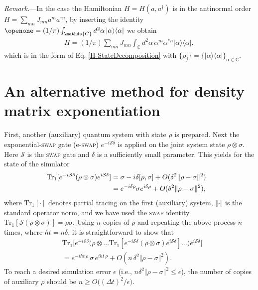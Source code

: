 \documentclass[aps,pra,twocolumn,floatfix,groupedaddress,superscriptaddress,nofootinbib,notitlepage]{revtex4-2}
\begin{document}
\textit{Remark.}---In the case the Hamiltonian $H=H(a, a^{\dag})$ is in the antinormal order $H=\sum_{mn} J_{mn}a^{m} a^{\dag n}$, by inserting the identity $\openone= (1/\pi)\int_{\mathds{C}} d^{2}\alpha\,|\alpha\rangle\langle \alpha|$ we obtain 
\begin{align}
H = (1/\pi) \textstyle{\sum_{mn}} J_{mn}\int_{\mathds{C}} d^{2}\alpha \, \alpha^{m} \alpha^{* n} |\alpha\rangle\langle \alpha|,
\end{align}
which is in the form of Eq. \eqref{H-StateDecomposition} with $\{\rho_{j}\}= \{|\alpha\rangle\langle \alpha|\}_{\alpha\in\mathds{C}}$.
\section{An alternative method for density matrix exponentiation}

First, another (auxiliary) quantum system with state $\rho$ is prepared. Next the exponential-\textsc{swap} gate (e-\textsc{swap}) $e^{-i\mathcal{S} \delta}$ is applied on the joint system state $\rho \otimes \sigma$. Here $\mathcal{S}$ is the \textsc{swap} gate and $\delta$ is a sufficiently small parameter. This yields for the state of the simulator 
\begin{align}
\hskip-3mm\mathrm{Tr}_{1}[e^{-i\mathcal{S} \delta} (\rho \otimes \sigma) e^{i\mathcal{S} \delta}] & = \sigma - i \delta [\rho, \sigma] + O(\delta^{2} \Vert \rho - \sigma \Vert^{2}) \nonumber\\
&= e^{- i \delta \rho} \sigma e^{i \delta \rho} + O(\delta^{2} \Vert \rho-\sigma \Vert^{2}),
\label{eq7}
\end{align} 
where $\mathrm{Tr}_{1}[\cdot]$ denotes partial tracing on the first (auxiliary) system, $\Vert \cdot\Vert$ is the standard operator norm, and we have used the \textsc{swap} identity $\mathrm{Tr}_{1}[\mathcal{S} (\rho\otimes \sigma)]=\rho \sigma$. Using $n$ copies of $\rho$ and repeating the above process $n$ times, where $h t= n \delta$, it is straightforward to show that 
\begin{align}
&\mathrm{Tr}_{1}\big[e^{-i\mathcal{S} \delta} \big(\rho \otimes \ldots \mathrm{Tr}_{1}[e^{-i\mathcal{S} \delta} (\rho \otimes \sigma) e^{i\mathcal{S}\delta}]\ldots\big) e^{i\mathcal{S} \delta}\big]\nonumber\\
&= e^{-i h t\,\rho}\,\sigma \, e^{i h t\,\rho}+ O(n \,\delta^{2} \Vert\rho-\sigma \Vert^{2}).
\label{eq:acc}
\end{align} 
To reach a desired simulation error $\epsilon$ (i.e., $n\delta^{2} \Vert\rho-\sigma \Vert^{2} \leqslant \epsilon$), the number of copies of auxiliary $\rho$ should be $n \geqslant O\big((\Delta t)^{2}/\epsilon\big)$.
\end{document}
